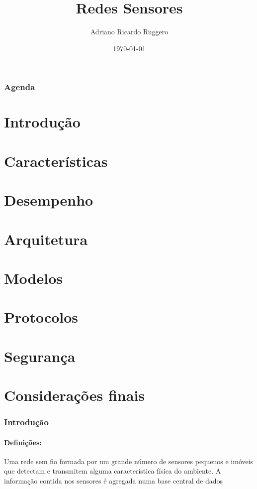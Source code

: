 \documentclass[notes]{beamer}
\title{Redes Sensores}
\subtitle{}
\author{Adriano Ricardo Ruggero}
\institute{Instituto de Computação - Unicamp}
\date{\today}
\begin{document}
\begin{frame}
  \titlepage
\end{frame}

\begin{frame}
  \frametitle{Agenda}
  \tableofcontents
\end{frame}

\section{Introdução}

\section{Características}

\section{Desempenho}

\section{Arquitetura}

\section{Modelos}

\section{Protocolos}

\section{Segurança}

\section{Considerações finais}

\begin{frame}

\frametitle{Introdução}

\framesubtitle{Definições:} 

\begin{block}

Uma rede sem fio formada por um grande número de sensores pequenos e imóveis  que detectam e transmitem alguma característica física do ambiente. A informação contida nos sensores é agregada numa base central de dados \cite{Malladi_1}

\end{block}

\end{frame}
\end{document}
